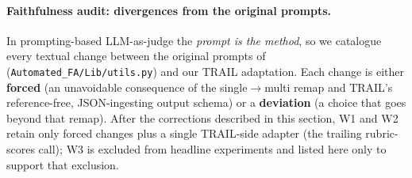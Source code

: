\paragraph{Faithfulness audit: divergences from the original prompts.}
In prompting-based LLM-as-judge the \emph{prompt is the method}, so we
catalogue every textual change between the original prompts of
\citet{yin2025whoandwhen} (\texttt{Automated\_FA/Lib/utils.py}) and our
TRAIL adaptation. Each change is either \textbf{forced} (an unavoidable
consequence of the single$\to$multi remap and TRAIL's reference-free,
JSON-ingesting output schema) or a \textbf{deviation} (a choice that goes
beyond that remap). After the corrections described in this section,
\textsc{W1} and \textsc{W2} retain only forced changes plus a single
TRAIL-side adapter (the trailing rubric-scores call); \textsc{W3} is
excluded from headline experiments and listed here only to support that
exclusion.


